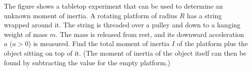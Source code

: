 The figure shows a tabletop experiment that can be used to determine
an unknown moment of inertia. A rotating platform of radius $R$ has
a string wrapped around it. The string is threaded over a pulley and
down to a hanging weight of mass $m$. The mass is released from rest,
and its downward acceleration $a$ ($a>0$) is measured. Find the total moment of inertia
$I$ of the platform plus the object sitting on top of it.
(The moment of inertia of the object itself can then be found by
subtracting the value for the empty platform.)\answercheck
